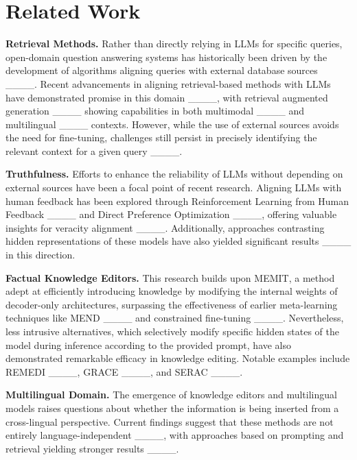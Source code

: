 \section{Related Work}
\textbf{Retrieval Methods.} Rather than directly relying in LLMs for specific queries, open-domain question answering systems has historically been driven by the development of algorithms aligning queries with external database sources ____. Recent advancements in aligning retrieval-based methods with LLMs have demonstrated promise in this domain ____, with retrieval augmented generation ____ showing capabilities in both multimodal ____ and multilingual ____ contexts. However, while the use of external sources avoids the need for fine-tuning, challenges still persist in precisely identifying the relevant context for a given query ____.

\textbf{Truthfulness.} Efforts to enhance the reliability of LLMs without depending on external sources have been a focal point of recent research. Aligning LLMs with human feedback has been explored through Reinforcement Learning from Human Feedback ____ and Direct Preference Optimization ____, offering valuable insights for veracity alignment ____. Additionally, approaches contrasting hidden representations of these models have also yielded significant results ____ in this direction.

\textbf{Factual Knowledge Editors.}
This research builds upon MEMIT, a method adept at efficiently introducing knowledge by modifying the internal weights of decoder-only architectures, surpassing the effectiveness of earlier meta-learning techniques like MEND ____ and constrained fine-tuning ____. Nevertheless, less intrusive alternatives, which selectively modify specific hidden states of the model during inference according to the provided prompt, have also demonstrated remarkable efficacy in knowledge editing. Notable examples include REMEDI ____, GRACE ____, and SERAC ____. 

\textbf{Multilingual Domain.}
The emergence of knowledge editors and multilingual models raises questions about whether the information is being inserted from a cross-lingual perspective. Current findings suggest that these methods are not entirely language-independent ____, with approaches based on prompting and retrieval yielding stronger results ____. 


